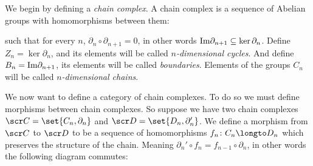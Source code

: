 We begin by defining a {\it chain complex}.
A chain complex is a sequence of Abelian groups with homomorphisms between them:

\medskip
\centerline{}
\medskip

such that for every $n$, $\partial_n\circ\partial_{n+1}=0$, in other words ${\rm Im}\partial_{n+1}\subseteq\ker\partial_n$.
Define $Z_n=\ker\partial_n$, and its elements will be called {\it $n$-dimensional cycles}.
And define $B_n={\rm Im}\partial_{n+1}$, its elements will be called {\it boundaries}.
Elements of the groups $C_n$ will be called {\it $n$-dimensional chains}.

We now want to define a category of chain complexes.
To do so we must define morphisms between chain complexes.
So suppose we have two chain complexes ${\scr C}=\set{C_n,\partial_n}$ and ${\scr D}=\set{D_n,\partial'_n}$.
We define a morphism from ${\scr C}$ to ${\scr D}$ to be a sequence of homomorphisms $f_n\colon C_n\longto D_n$ which preserves the structure of the chain.
Meaning $\partial_n'\circ f_n=f_{n-1}\circ\partial_n$, in other words the following diagram commutes:

\bigskip
\centerline{\def\diagrowbuf{.5cm}}
\medskip


